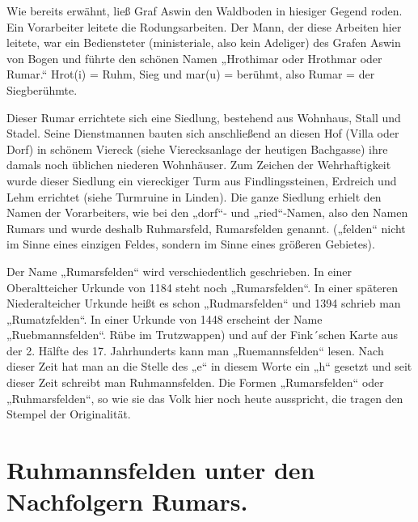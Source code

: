 \documentclass[12pt,a4paper]{book}
\begin{document}
Wie bereits erwähnt, ließ Graf Aswin den Waldboden in hiesiger Gegend roden. Ein
Vorarbeiter leitete die Rodungsarbeiten. Der Mann, der diese Arbeiten hier
leitete, war ein Bediensteter (ministeriale, also kein Adeliger) des Grafen
Aswin von Bogen und führte den schönen Namen „Hrothimar oder Hrothmar oder
Rumar.“ Hrot(i) = Ruhm, Sieg und mar(u) = berühmt, also Rumar = der
Siegberühmte.

Dieser Rumar errichtete sich eine Siedlung, bestehend aus Wohnhaus, Stall und
Stadel. Seine Dienstmannen bauten sich anschließend an diesen Hof (Villa oder
Dorf) in schönem Viereck (siehe Vierecksanlage der heutigen Bachgasse) ihre
damals noch üblichen niederen Wohnhäuser. Zum Zeichen der Wehrhaftigkeit wurde
dieser Siedlung ein viereckiger Turm aus Findlingssteinen, Erdreich und Lehm
errichtet (siehe Turmruine in Linden). Die ganze Siedlung erhielt den Namen der
Vorarbeiters, wie bei den „dorf“- und „ried“-Namen, also den Namen Rumars und
wurde deshalb Ruhmarsfeld, Rumarsfelden genannt. („felden“ nicht im Sinne eines
einzigen Feldes, sondern im Sinne eines größeren Gebietes).

Der Name „Rumarsfelden“ wird verschiedentlich geschrieben. In einer
Oberaltteicher Urkunde von 1184 steht noch „Rumarsfelden“. In einer späteren
Niederalteicher Urkunde heißt es schon „Rudmarsfelden“ und 1394 schrieb man
„Rumatzfelden“. In einer Urkunde von 1448 erscheint der Name „Ruebmannsfelden“.
Rübe im Trutzwappen) und auf der Fink´schen Karte aus der 2. Hälfte des 17.
Jahrhunderts kann man „Ruemannsfelden“ lesen. Nach dieser Zeit hat man an die
Stelle des „e“ in diesem Worte ein „h“ gesetzt und seit dieser Zeit schreibt man
Ruhmannsfelden. Die Formen „Rumarsfelden“ oder „Ruhmarsfelden“, so wie sie das
Volk hier noch heute ausspricht, die tragen den Stempel der Originalität.

\section{Ruhmannsfelden unter den Nachfolgern Rumars.}
\end{document}
